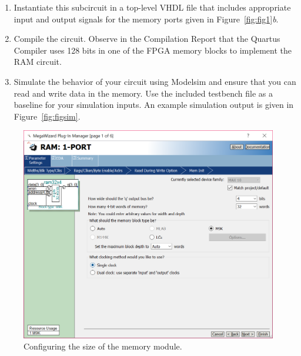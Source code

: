 \documentclass[epsfig,10pt,fullpage]{article}
\begin{document}
\begin{enumerate}
\item Instantiate this subcircuit in a top-level VHDL file that includes appropriate input and 
output signals for the memory ports given in Figure~\ref{fig:fig1}{\it b}.
\item Compile the circuit. Observe in the Compilation Report that the Quartus 
Compiler uses 128 bits in one of the FPGA memory blocks to implement the RAM circuit.
\item Simulate the behavior of your circuit using Modelsim and ensure that you can read and write data in
the memory. Use the included testbench file as a baseline for your simulation inputs.
An example simulation output is given in Figure~\ref{fig:figsim}.
\end{enumerate}

\begin{figure}[H]
	\begin{center}
		\includegraphics[scale=0.42]{figures/figure2.png}
	\end{center}
	\caption{Configuring the size of the memory module.}
	\label{fig:fig2}
\end{figure}
\end{document}

